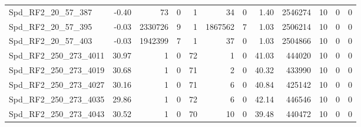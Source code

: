 \begin{longtable}[c]{@{}lrrrrrrrrrrr@{}}
Spd\_RF2\_20\_57\_387         & -0.40                  & 73                      & 0                       & 1                      & 34                      & 0                       & 1.40                    & 2546274                  & 10                       & 0                        & 0                        \\
Spd\_RF2\_20\_57\_395         & -0.03                  & 2330726                 & 9                       & 1                      & 1867562                 & 7                       & 1.03                    & 2506214                  & 10                       & 0                        & 0                        \\
Spd\_RF2\_20\_57\_403         & -0.03                  & 1942399                 & 7                       & 1                      & 37                      & 0                       & 1.03                    & 2504866                  & 10                       & 0                        & 0                        \\
Spd\_RF2\_250\_273\_4011      & 30.97                  & 1                       & 0                       & 72                     & 1                       & 0                       & 41.03                   & 444020                   & 10                       & 0                        & 0                        \\
Spd\_RF2\_250\_273\_4019      & 30.68                  & 1                       & 0                       & 71                     & 2                       & 0                       & 40.32                   & 433990                   & 10                       & 0                        & 0                        \\
Spd\_RF2\_250\_273\_4027      & 30.16                  & 1                       & 0                       & 71                     & 6                       & 0                       & 40.84                   & 425142                   & 10                       & 0                        & 0                        \\
Spd\_RF2\_250\_273\_4035      & 29.86                  & 1                       & 0                       & 72                     & 6                       & 0                       & 42.14                   & 446546                   & 10                       & 0                        & 0                        \\
Spd\_RF2\_250\_273\_4043      & 30.52                  & 1                       & 0                       & 70                     & 10                      & 0                       & 39.48                   & 440472                   & 10                       & 0                        & 0                        \\

\end{longtable}
